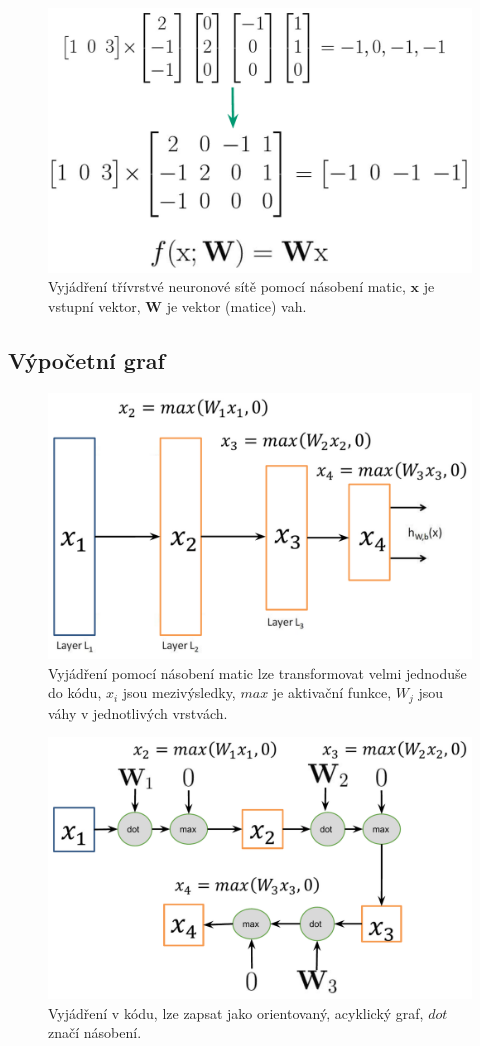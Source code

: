 \begin{figure}[H]
    \centering
    \includegraphics[width=0.65\linewidth]{nn_matrix_3.pdf}
    \caption{Vyjádření třívrstvé neuronové sítě pomocí násobení matic, $\mathbf{x}$ je vstupní vektor, $\mathbf{W}$ je vektor (matice) vah.}
\end{figure}

\subsection{Výpočetní graf}

\begin{figure}[H]
    \centering
    \includegraphics[width=0.65\linewidth]{nn_code.pdf}
    \caption{Vyjádření pomocí násobení matic lze transformovat velmi jednoduše do kódu, $x_i$ jsou mezivýsledky, $max$ je aktivační funkce, $W_j$ jsou váhy v jednotlivých vrstvách.}
\end{figure}

\begin{figure}[H]
    \centering
    \includegraphics[width=0.7\linewidth]{nn_graph.pdf}
    \caption{Vyjádření v kódu, lze zapsat jako orientovaný, acyklický graf, $dot$ značí násobení.}
\end{figure}

